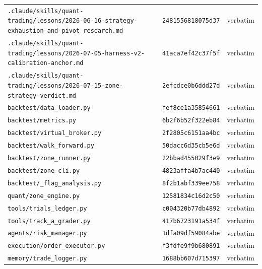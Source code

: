 {\begin{longtable}{@{}>{\raggedright\arraybackslash}p{8.6cm}p{2.7cm}>{\raggedright\arraybackslash}p{3.4cm}@{}}
\texttt{.claude/\allowbreak{}skills/\allowbreak{}quant-\allowbreak{}trading/\allowbreak{}lessons/\allowbreak{}2026-\allowbreak{}06-\allowbreak{}16-\allowbreak{}strategy-\allowbreak{}exhaustion-\allowbreak{}and-\allowbreak{}pivot-\allowbreak{}research.md} & \texttt{2481556818075d37} & verbatim \\
\texttt{.claude/\allowbreak{}skills/\allowbreak{}quant-\allowbreak{}trading/\allowbreak{}lessons/\allowbreak{}2026-\allowbreak{}07-\allowbreak{}05-\allowbreak{}harness-\allowbreak{}v2-\allowbreak{}calibration-\allowbreak{}anchor.md} & \texttt{41aca7ef42c37f5f} & verbatim \\
\texttt{.claude/\allowbreak{}skills/\allowbreak{}quant-\allowbreak{}trading/\allowbreak{}lessons/\allowbreak{}2026-\allowbreak{}07-\allowbreak{}15-\allowbreak{}zone-\allowbreak{}strategy-\allowbreak{}verdict.md} & \texttt{2efcdce0b6ddd27d} & verbatim \\
\texttt{backtest/\allowbreak{}data\_loader.py} & \texttt{fef8ce1a35854661} & verbatim \\
\texttt{backtest/\allowbreak{}metrics.py} & \texttt{6b2f6b52f322eb84} & verbatim \\
\texttt{backtest/\allowbreak{}virtual\_broker.py} & \texttt{2f2805c6151aa4bc} & verbatim \\
\texttt{backtest/\allowbreak{}walk\_forward.py} & \texttt{50dacc6d35cb5e6d} & verbatim \\
\texttt{backtest/\allowbreak{}zone\_runner.py} & \texttt{22bbad455029f3e9} & verbatim \\
\texttt{backtest/\allowbreak{}zone\_cli.py} & \texttt{4823affa4b7ac440} & verbatim \\
\texttt{backtest/\allowbreak{}\_flag\_analysis.py} & \texttt{8f2b1abf339ee758} & verbatim \\
\texttt{quant/\allowbreak{}zone\_engine.py} & \texttt{12581834c16d2c50} & verbatim \\
\texttt{tools/\allowbreak{}trials\_ledger.py} & \texttt{c004320b77db4892} & verbatim \\
\texttt{tools/\allowbreak{}track\_a\_grader.py} & \texttt{417b6723191a534f} & verbatim \\
\texttt{agents/\allowbreak{}risk\_manager.py} & \texttt{1dfa09df59084abe} & verbatim \\
\texttt{execution/\allowbreak{}order\_executor.py} & \texttt{f3fdfe9f9b680891} & verbatim \\
\texttt{memory/\allowbreak{}trade\_logger.py} & \texttt{1688bb607d715397} & verbatim \\

\end{longtable}}

